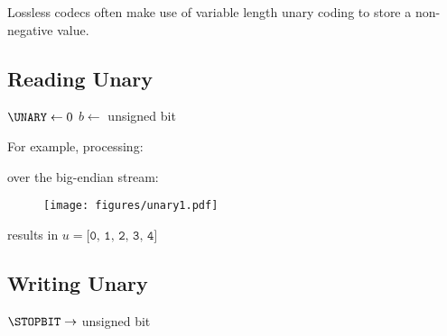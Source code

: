 Lossless codecs often make use of variable length unary coding
to store a non-negative value.

\subsection{Reading Unary}
$\UNARY \leftarrow 0$\;
$b \leftarrow$  unsigned bit\;
\Return \UNARY\;
\EALGORITHM
\par
\noindent
For example, processing:
\par
\noindent
\begin{algorithm}[H]
  \DontPrintSemicolon
\end{algorithm}
\par
\noindent
over the big-endian stream:
\begin{figure}[h]
  \texttt{[image: figures/unary1.pdf]}
\end{figure}
\par
\noindent
results in $u = \texttt{[0, 1, 2, 3, 4]}$

\subsection{Writing Unary}
$\STOPBIT \rightarrow$  unsigned bit\;
\EALGORITHM
